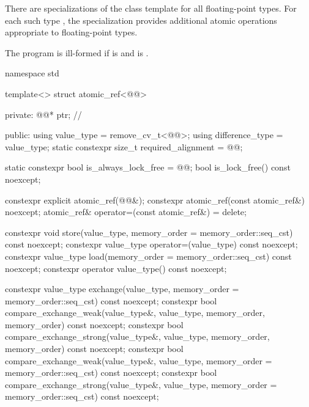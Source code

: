 \pnum
{}%
There are specializations of the  class template
for all floating-point types.
For each such type ,
the specialization  provides
additional atomic operations appropriate to floating-point types.

\pnum
The program is ill-formed
if  is  and
 is .

\begin{codeblock}
namespace std {
  template<> struct atomic_ref<@@> {
  private:
    @@* ptr;   // \expos

  public:
    using value_type = remove_cv_t<@@>;
    using difference_type = value_type;
    static constexpr size_t required_alignment = @@;

    static constexpr bool is_always_lock_free = @@;
    bool is_lock_free() const noexcept;

    constexpr explicit atomic_ref(@@&);
    constexpr atomic_ref(const atomic_ref&) noexcept;
    atomic_ref& operator=(const atomic_ref&) = delete;

    constexpr void store(value_type,
                         memory_order = memory_order::seq_cst) const noexcept;
    constexpr value_type operator=(value_type) const noexcept;
    constexpr value_type load(memory_order = memory_order::seq_cst) const noexcept;
    constexpr operator value_type() const noexcept;

    constexpr value_type exchange(value_type,
                                 memory_order = memory_order::seq_cst) const noexcept;
    constexpr bool compare_exchange_weak(value_type&, value_type,
                               memory_order, memory_order) const noexcept;
    constexpr bool compare_exchange_strong(value_type&, value_type,
                                 memory_order, memory_order) const noexcept;
    constexpr bool compare_exchange_weak(value_type&, value_type,
                               memory_order = memory_order::seq_cst) const noexcept;
    constexpr bool compare_exchange_strong(value_type&, value_type,
                                 memory_order = memory_order::seq_cst) const noexcept;

}}
\end{codeblock}
